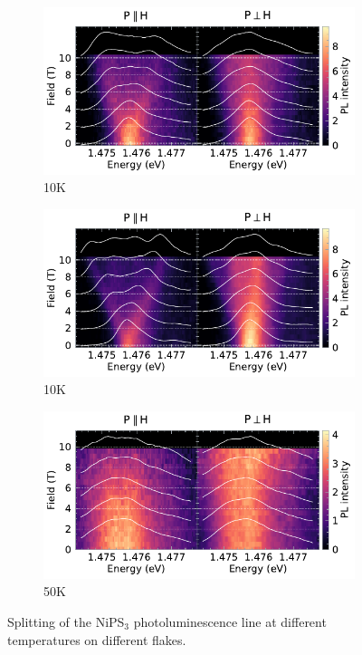 \documentclass[
	oneside,
	parskip=half,
	a4paper,
]{scrbook}
\begin{document}
\begin{figure}
	\centering
	\begin{subfigure}{4in}
		\includegraphics{../figures/2024-04-18 NiPS4 splitting 10K.pdf}
		\caption{10K}
		\label{fig:NiPS3 10K}
	\end{subfigure}
	\begin{subfigure}{4in}
		\includegraphics{../figures/2024-04-18 NiPS4 splitting 10K multiple flakes.pdf}
		\caption{10K}
		\label{fig:NiPS3 10K multiple flakes}
	\end{subfigure}
	\begin{subfigure}{4in}
		\includegraphics{../figures/2024-04-18 NiPS4 splitting 50K.pdf}
		\caption{50K}
		\label{fig:NiPS3 50K}
	\end{subfigure}
	\caption{Splitting of the NiPS$_3$ photoluminescence line at different temperatures on different flakes.}
	\label{fig:NiPS3 multiple temperatures}
\end{figure}
\end{document}
